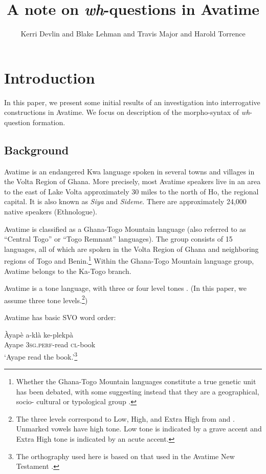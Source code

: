\documentclass[output=paper]{langscibook}
\author{Kerri Devlin\affiliation{UCLA} and Blake Lehman\affiliation{UCLA} and Travis Major\affiliation{UCLA} and Harold Torrence\affiliation{UCLA}}
\title{A note on \textit{wh}-questions in Avatime}
\begin{document}
\maketitle

\section{Introduction}


In this paper, we present some initial results of an investigation into interrogative constructions in Avatime. We focus on description of the morpho-syntax of \textit{wh}-question formation.

\subsection{Background}
Avatime is an endangered Kwa language spoken in several towns and villages in the Volta Region of Ghana.  More precisely, most Avatime speakers live in an area to the east of Lake Volta approximately 30 miles to the north of Ho, the regional capital. It is also known as \textit{Siya} and \textit{Sideme}.  There are approximately 24,000 native speakers (Ethnologue).

Avatime is classified as a Ghana-Togo Mountain language (also referred to as ``Central Togo” or ``Togo Remnant” languages). The group consists of 15 languages, all of which are spoken in the Volta Region of Ghana and neighboring regions of Togo and Benin.\footnote{Whether the Ghana-Togo Mountain languages constitute a true genetic unit has been debated, with some suggesting instead that they are a geographical, socio- cultural or typological group \citep{ameka2017ghana}.} Within the Ghana-Togo Mountain language group, Avatime belongs to the Ka-Togo branch.

Avatime is a tone language, with three or four level tones \citep{ford:1971, dakubu1988central, schuh1995aspects,defina2009aspect, van2014information}. (In this paper, we assume three tone levels.\footnote{The three levels correspond to Low, High, and Extra High from \citet{ford:1971} and \citet{van2014information}. Unmarked vowels have high tone.  Low tone is indicated by a grave accent and Extra High tone is indicated by an acute accent.})

Avatime has basic SVO word order:

\ea \label{ex:devlin:svo}
\gll \`{A}yap\`{e} a-kl\`{a} ke-plekp\`{a}\\
Ayape \textsc{3sg}.\textsc{perf}-read \textsc{cl}-book\\
\glt `Ayape read the book.'\footnote{The orthography used here is based on that used in the Avatime New Testament \citep{gillbt2017}.}
\z
\end{document}
